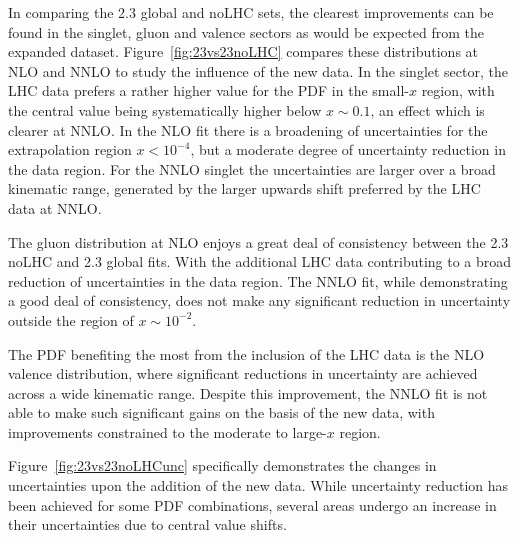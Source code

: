 In comparing the 2.3 global and noLHC sets, the clearest improvements can be found in the singlet, gluon and valence sectors as would be expected from the expanded dataset. Figure~\ref{fig:23vs23noLHC} compares these distributions at NLO and NNLO to study the influence of the new data. In the singlet sector, the LHC data prefers a rather higher value for the PDF in the small-$x$ region, with the central value being systematically higher below $x\sim 0.1$, an effect which is clearer at NNLO. In the NLO fit there is a broadening of uncertainties for the extrapolation region $x < 10^{-4}$, but a moderate degree of uncertainty reduction in the data region. For the NNLO singlet the uncertainties are larger over a broad kinematic range, generated by the larger upwards shift preferred by the LHC data at NNLO.

The gluon distribution at NLO enjoys a great deal of consistency between the 2.3 noLHC and 2.3 global fits. With the additional LHC data contributing to a broad reduction of uncertainties in the data region. The NNLO fit, while demonstrating a good deal of consistency, does not make any significant reduction in uncertainty outside the region of $x\sim10^{-2}$.

The PDF benefiting the most from the inclusion of the LHC data is the NLO valence distribution, where significant reductions in uncertainty are achieved across a wide kinematic range. Despite this improvement, the NNLO fit is not able to make such significant gains on the basis of the new data, with improvements constrained to the moderate to large-$x$ region.

Figure~\ref{fig:23vs23noLHCunc} specifically demonstrates the changes in uncertainties upon the addition of the new data. While uncertainty reduction has been achieved for some PDF combinations, several areas undergo an increase in their uncertainties due to central value shifts.

